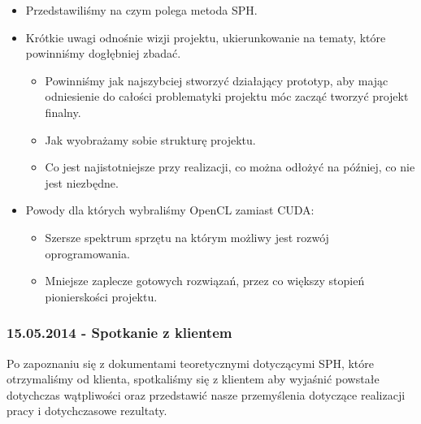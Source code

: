 \documentclass[polish, 12pt]{aghthesis}
\begin{document}
			\begin{itemize}
			
				\item Przedstawiliśmy na czym polega metoda SPH.
				\item Krótkie uwagi odnośnie wizji projektu, ukierunkowanie na tematy, które powinniśmy dogłębniej zbadać.
					\begin{itemize}
						\item Powinniśmy jak najszybciej stworzyć działający prototyp, aby mając odniesienie do całości problematyki projektu móc zacząć tworzyć projekt finalny.
						\item Jak wyobrażamy sobie strukturę projektu.
						\item Co jest najistotniejsze przy realizacji, co można odłożyć na później, co nie jest niezbędne.
					\end{itemize}
				\item Powody dla których wybraliśmy OpenCL zamiast CUDA:
					\begin{itemize}
						
						\item Szersze spektrum sprzętu na którym możliwy jest rozwój oprogramowania.
						\item Mniejsze zaplecze gotowych rozwiązań, przez co większy stopień pionierskości projektu.
						
					\end{itemize}
			
			\end{itemize}
			
		\subsubsection*{15.05.2014 - Spotkanie z klientem}
		
			Po zapoznaniu się z dokumentami teoretycznymi dotyczącymi SPH, które otrzymaliśmy od klienta, spotkaliśmy się z klientem aby wyjaśnić powstałe dotychczas wątpliwości oraz przedstawić nasze przemyślenia dotyczące realizacji pracy i dotychczasowe rezultaty.
			
\end{document}
